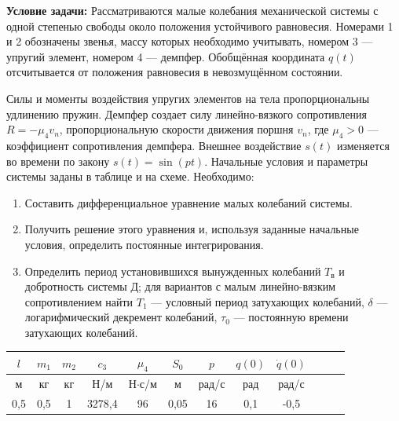\documentclass{article}
\begin{document}
\begin{minipage}{0.1\textwidth}
\end{minipage}
\hfill
\begin{minipage}{0.45\textwidth}
\par
\vspace{5pt}
\textbf{Условие задачи:}
Рассматриваются малые колебания механической системы с одной степенью свободы около положения устойчивого равновесия. Номерами 1 и 2 обозначены звенья, массу которых необходимо учитывать, номером 3 --- упругий элемент, номером 4 --- демпфер. Обобщённая координата $q(t)$ отсчитывается от положения равновесия в невозмущённом состоянии.
\end{minipage}
\par
\vspace{5pt}
\noindent
Силы и моменты воздействия упругих элементов на тела пропорциональны
удлинению пружин. Демпфер создает силу линейно-вязкого сопротивления $R = -\mu_4 v_n$, пропорциональную скорости движения поршня $v_n$, где $\mu_4 > 0$ --- коэффициент сопротивления демпфера. Внешнее воздействие $s(t)$ изменяется во времени по закону $s(t) = \sin(pt)$. Начальные условия и параметры системы заданы в таблице и на схеме. Необходимо:
\begin{enumerate}
	\item Составить дифференциальное уравнение малых колебаний системы.
	\item Получить решение этого уравнения и, используя заданные начальные условия, определить постоянные интегрирования.
	\item Определить период установившихся вынужденных колебаний $T_\text{в}$ и добротность системы $\text{Д}$; для вариантов с малым линейно-вязким сопротивлением найти $T_1$ --- условный период затухающих колебаний, $\delta$ --- логарифмический декремент колебаний, $\tau_0$ --- постоянную времени затухающих колебаний.
\end{enumerate}
\begin{center}
	\begin{tabular}{|c|c|c|c|c|c|c|c|c|c|c|c|}
		\hline
		$l$ & $m_1$ & $m_2$ & $c_3$ & $\mu_4$ & $S_0$ & $p$ & $q(0)$ & $\dot{q}(0)$ \\
		\hline
		м & кг & кг & Н/м & Н$\cdot$с/м & м & рад/с & рад & рад/с \\
		\hline
		0,5 & 0,5 & 1 & 3278,4 & 96 & 0,05 & 16 & 0,1 & -0,5 \\
		\hline
	\end{tabular}
\end{center}
\newpage
\end{document}

